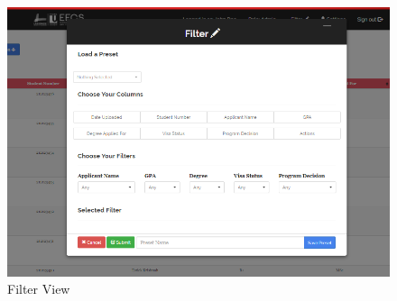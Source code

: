 \documentclass[fontsize=12pt,paper=letter,twoside]{scrartcl}
\begin{document}
\begin{figure}[!htb]
\begin{center}
\includegraphics[width=.99\textwidth]{images/ma/default_filter_view.png}
\end{center}
\caption{Filter View}
\label{fig:filter_view}
\end{figure}

\clearpage
\newpage
\end{document}

